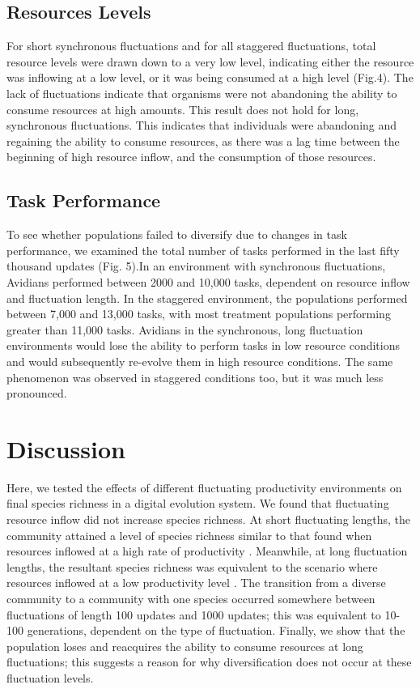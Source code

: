 \documentclass[10pt]{article}
\begin{document}
\subsection{Resources Levels}

For short synchronous fluctuations and for all staggered fluctuations, total resource levels were drawn down to a very low level, indicating either the resource was inflowing at a low level, or it was being consumed at a high level (Fig.4). The lack of fluctuations indicate that organisms were not abandoning the ability to consume resources at high amounts. This result does not hold for long, synchronous fluctuations. This indicates that individuals were abandoning and regaining the ability to consume resources, as there was a lag time between the beginning of high resource inflow, and the consumption of those resources.

\subsection{Task Performance}
To see whether populations failed to diversify due to changes in task performance, we examined the total number of tasks performed in the last fifty thousand updates (Fig. 5).In an environment with synchronous fluctuations, Avidians performed between 2000 and 10,000 tasks, dependent on resource inflow and fluctuation length. In the staggered environment, the populations performed between 7,000 and 13,000 tasks, with most treatment populations performing greater than 11,000 tasks. Avidians in the synchronous, long fluctuation environments would lose the ability to perform tasks in low resource conditions and would subsequently re-evolve them in high resource conditions. The same phenomenon was observed in staggered conditions too, but it was much less pronounced.

\section{Discussion}

Here, we tested the effects of different fluctuating productivity environments on final species richness in a digital evolution system. We found that fluctuating resource inflow did not increase species richness. At short fluctuating lengths, the community attained a level of species richness similar to that found when resources inflowed at a high rate of productivity \cite{chow2004adaptive}. Meanwhile, at long fluctuation lengths, the resultant species richness was equivalent to the scenario where resources inflowed at a low productivity level \cite{chow2004adaptive}. The transition from a diverse community to a community with one species occurred somewhere between fluctuations of length 100 updates and 1000 updates; this was equivalent to 10-100 generations, dependent on the type of fluctuation. Finally, we show that the population loses and reacquires the ability to consume resources at long fluctuations; this suggests a reason for why diversification does not occur at these fluctuation levels.
\end{document}
